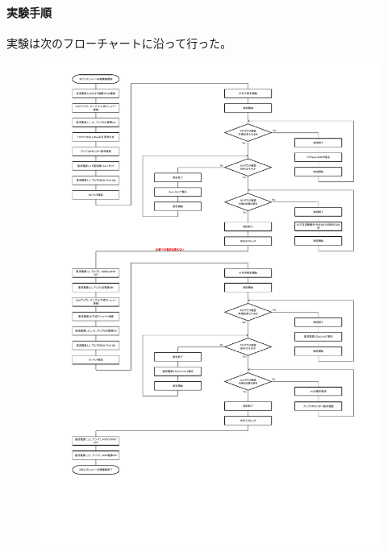 \paragraph{実験手順}
実験は次のフローチャートに沿って行った。
\begin{figure}[h]
\centering
\includegraphics[width=\hsize]{resonance/whatwhyhow/Resonance_flow.pdf}
\vspace{-3.5cm}
\end{figure}

